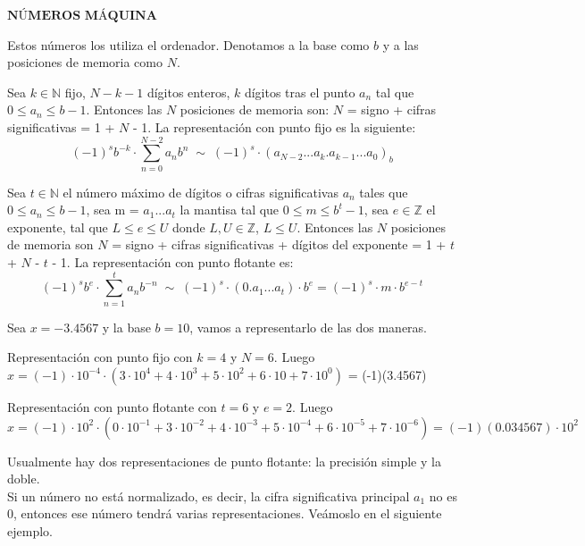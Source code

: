 $\textbf{NÚMEROS MÁQUINA}$

Estos números los utiliza el ordenador. Denotamos a la base como $b$ y a las posiciones de memoria como $N$.

\begin{ndef}
Sea $k \in \mathbb{N}$ fijo, $N - k -1$ dígitos enteros, $k$ dígitos tras el punto $a_n$ tal que $0 \leq a_n \leq b - 1$. Entonces las $N$ posiciones de memoria son: $N$ = signo + cifras significativas = 1 + $N$ - 1. La representación con punto fijo es la siguiente:
\[ (-1)^s b^{-k} \cdot \sum_{n=0}^{N-2}a_nb^n \; \sim \; (-1)^s \cdot (a_{N-2}...a_k.a_{k-1}...a_0)_b \]
\end{ndef}

\begin{ndef}
Sea $t \in \mathbb{N}$ el número máximo de dígitos o cifras significativas $a_n$ tales que $0 \leq a_n \leq b - 1$, sea m = $a_1...a_t$ la mantisa tal que $0 \leq m \leq b^t - 1$, sea $e \in \mathbb{Z}$ el exponente, tal que $L \leq e \leq U$ donde $L, U \in \mathbb{Z}$, $L \leq U$. Entonces las $N$ posiciones de memoria son $N$ = signo + cifras significativas + dígitos del exponente = 1 + $t$ + $N$ - $t$ - 1. La representación con punto flotante es:
\[ (-1)^sb^e \cdot \sum_{n=1}^t a_nb^{-n} \; \sim \; (-1)^s \cdot (0.a_1...a_t) \cdot b^e = (-1)^s \cdot m \cdot b^{e-t} \]
\end{ndef}

\begin{ejemplo}
Sea $x = -3.4567$ y la base $b = 10$, vamos a representarlo de las dos maneras.
	\begin{nlist}
	\item Representación con punto fijo con $k = 4$ y $N = 6$. Luego $x = (-1) \cdot 10^{-4} \cdot (3 \cdot 10^4 + 4 \cdot 10^3 + 5 \cdot 10^2 + 6 \cdot 10 + 7 \cdot 10^0)$ = (-1)(3.4567)
	\item Representación con punto flotante con $t = 6$ y $e = 2$. Luego $x = (-1) \cdot 10^2 \cdot (0 \cdot 10^{-1} + 3 \cdot 10^{-2} + 4 \cdot 10^{-3} + 5 \cdot 10^{-4} + 6 \cdot 10^{-5} + 7 \cdot 10^{-6}) = (-1)(0.034567) \cdot 10^2$
	\end{nlist}
\end{ejemplo}

Usualmente hay dos representaciones de punto flotante: la precisión simple y la doble.\\
Si un número no está normalizado, es decir, la cifra significativa principal $a_1$ no es 0, entonces ese número tendrá varias representaciones. Veámoslo en el siguiente ejemplo. 

